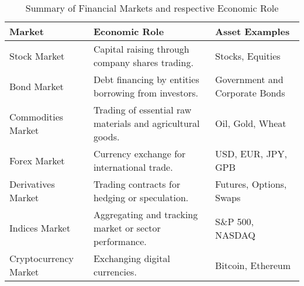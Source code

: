 \begin{table}[htb!]
\caption{Summary of Financial Markets and respective Economic Role}
\label{Table:FinancialMarkets}
\centering
\footnotesize
\begin{tabularx}{\textwidth}{@{}lXl@{}}
\toprule
\textbf{Market} & \textbf{Economic Role} & \textbf{Asset Examples} \\
\midrule
Stock Market & Capital raising through company shares trading. & Stocks, Equities \\
\addlinespace
Bond Market & Debt financing by entities borrowing from investors. & Government and Corporate Bonds \\
\addlinespace
Commodities Market & Trading of essential raw materials and agricultural goods. & Oil, Gold, Wheat \\
\addlinespace
Forex Market & Currency exchange for international trade. & USD, EUR, JPY, GPB \\
\addlinespace
Derivatives Market & Trading contracts for hedging or speculation. & Futures, Options, Swaps \\
\addlinespace
Indices Market & Aggregating and tracking market or sector performance. & S\&P 500, NASDAQ \\
\addlinespace
Cryptocurrency Market & Exchanging digital currencies. & Bitcoin, Ethereum \\
\bottomrule
\end{tabularx}
\end{table}
